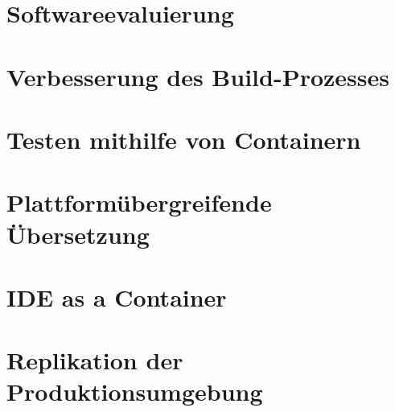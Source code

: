\section{Softwareevaluierung}
\label{sec:softwareevaluierung}
\section{Verbesserung des Build-Prozesses}
\label{sec:build-prozess-verbesserung}
\section{Testen mithilfe von Containern}
\label{sec:containerbasiertes-testen}
\section{Plattformübergreifende Übersetzung}
\label{sec:plattformuebergreifende-uebersetzung}
\section{IDE as a Container}
\label{sec:ideasacontainer}
\section{Replikation der Produktionsumgebung}
\label{sec:replikation-produktionsumgebung}


